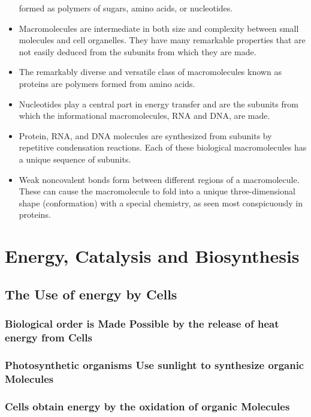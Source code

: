 \begin{itemize}
formed as polymers of sugars, amino acids, or nucleotides.
\item Macromolecules are intermediate in both size and complexity between
small molecules and cell organelles. They have many remarkable
properties that are not easily deduced from the subunits from which
they are made.
\item The remarkably diverse and versatile class of macromolecules known
as proteins are polymers formed from amino acids.
\item Nucleotides play a central part in energy transfer and are the subunits 
from which the informational macromolecules, RNA and DNA, are made.
\item Protein, RNA, and DNA molecules are synthesized from subunits by
repetitive condensation reactions. Each of these biological macromolecules 
has a unique sequence of subunits.
\item Weak noncovalent bonds form between different regions of a macromolecule. 
These can cause the macromolecule to fold into a unique
three-dimensional shape (conformation) with a special chemistry, as
seen most conspicuously in proteins.
\end{itemize}

\chapter{Energy, Catalysis and Biosynthesis}

\section{The Use of energy by Cells}



\subsection{Biological order is Made Possible by the release of heat energy from Cells}

\subsection{Photosynthetic organisms Use sunlight to synthesize organic Molecules}

\subsection{Cells obtain energy by the oxidation of organic Molecules}

